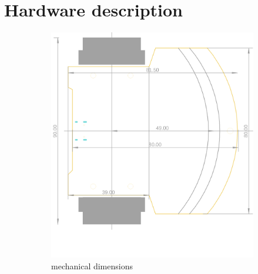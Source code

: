 \documentclass[12pt,twoside,onecolumn,openany,extrafontsizes,dvipsnames]{memoir}
\title{\booktitle}
\author{\authorname}
\begin{document}
\chapter{Hardware description}


\newpage
\begin{figure}[h]
    \begin{subfigure}{.5\textwidth}
        \centering
        \includegraphics[scale=0.35]{../images/board_dims_a.png}
        \caption{mechanical dimensions}
        \label{fig:mechanical_dimensions}
    \end{subfigure}%
    \begin{subfigure}{.5\textwidth}
        \centering

\end{subfigure}
\end{figure}
\end{document}
